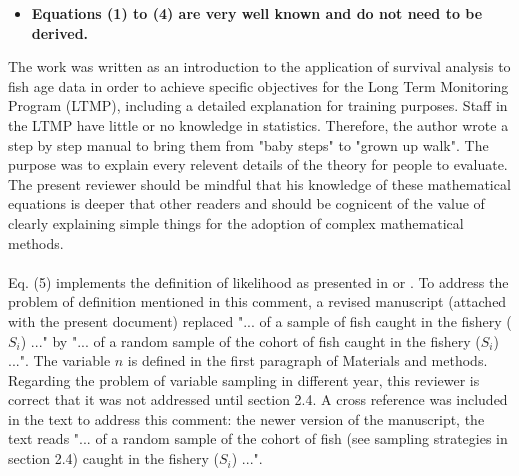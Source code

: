 \documentclass[11pt]{article}
\begin{document}
\begin{spacing}{1.2}
\begin{itemize}
\item {\bf Equations (1) to (4) are very well known and do not need to be derived.}
\end{itemize}
The work was written as an introduction to the application of survival analysis to fish age data in order to achieve specific objectives for the Long Term Monitoring Program (LTMP), including a detailed explanation for training purposes. Staff in the LTMP have little or no knowledge in statistics. Therefore, the author wrote a step by step manual to bring them from "baby steps" to "grown up walk". The purpose was to explain every relevent details of the theory for people to evaluate. The present reviewer should be mindful that his knowledge of these mathematical equations is deeper that other readers and should be cognicent of the value of clearly explaining simple things for the adoption of complex mathematical methods. \\

 \\
Eq. (5) implements the definition of likelihood as presented in \citep{edwards1992likelihood} or \citep{pawitan2013all}. To address the problem of definition mentioned in this comment, a revised manuscript (attached with the present document) replaced "... of a sample of fish caught in the fishery ($S_{i}$) ..." by "... of a random sample of the cohort of fish caught in the fishery ($S_{i}$) ...". The variable $n$ is defined in the first paragraph of Materials and methods. \\
Regarding the problem of variable sampling in different year, this reviewer is correct that it was not addressed until section 2.4. A cross reference was included in the text to address this comment: the newer version of the manuscript, the text reads "... of a random sample of the cohort of fish (see sampling strategies in section 2.4) caught in the fishery ($S_{i}$) ...". \\


\end{spacing}
\end{document}
